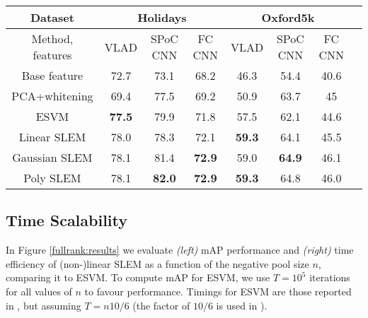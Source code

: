 \begin{table*}[t]
\begin{center}
\caption{Mean average precision results for INRIA Holidays and Oxford5k datasets, expressed as percentages. In this table, we present our results for VLAD \cite{Delhumeau2013}, sum-pooling of convolutional features (SPoC CNN) \cite{babenko15},  and activation coefficients form the previous-to-last CNN layer (FC CNN) of the architecture in \cite{Krizhevsky2012}}
\setlength{\tabcolsep}{.2em}
\small
\begin{tabular}{c@{\hskip 2em}ccc@{\hskip 2em}cccc}
\toprule
Dataset & \multicolumn{3}{c}{\textbf{Holidays}} & \multicolumn{3}{c}{\textbf{Oxford5k}}\\
\midrule
Method, features & VLAD  & SPoC CNN & FC CNN & VLAD & SPoC CNN & FC CNN\\
\midrule
Base feature            & 72.7         & 73.1         & 68.2         & 46.3           & 54.4         & 40.6\\
PCA+whitening       & 69.4         & 77.5         & 69.2         & 50.9           & 63.7         & 45 \\
ESVM               & \textbf{77.5} & 79.9         & 71.8         & 57.5           & 62.1         & 44.6\\
Linear SLEM         & 78.0           & 78.3         & 72.1         & \textbf{59.3}   & 64.1         & 45.5\\
Gaussian SLEM       & 78.1         & 81.4         & \textbf{72.9} & 59.0            & \textbf{64.9} & 46.1\\
Poly SLEM           & 78.1         & \textbf{82.0}   & \textbf{72.9} & \textbf{59.3}  & 64.8         & 46.0\\
\bottomrule
\end{tabular}
\end{center}
\label{fullrank:results}
\end{table*}

\subsection{Time Scalability} \label{time-scale}
In Figure \ref{fullrank:results} we evaluate \textit{(left)} mAP performance and \textit{(right)} time efficiency of (non-)linear SLEM as a function of the negative pool size $n$, comparing it to ESVM. To compute mAP for ESVM, we use $T=10^5$ iterations for all values of $n$ to favour performance. Timings for ESVM are those reported in \cite{ZePe15}, but assuming $T=n 10/6$ (the factor of $10/6$ is used in \cite{ZePe15}).

